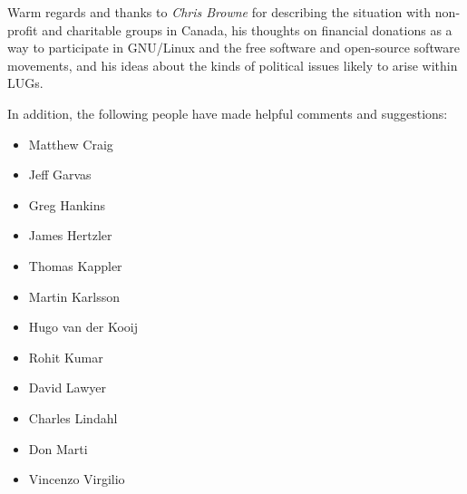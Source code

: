 Warm regards and thanks to 
\emph{Chris Browne} \texttt{\aexurl}
 for describing the situation with
non-profit and charitable groups in Canada, his thoughts on financial
donations as a way to participate in GNU/Linux and the free software and 
open-source software movements, and his ideas about the kinds of
political issues likely to arise within LUGs.

In addition, the following people have made helpful comments and
suggestions:

\begin{itemize}
\item Matthew Craig
\item Jeff Garvas
\item Greg Hankins
\item James Hertzler
\item Thomas Kappler
\item Martin Karlsson
\item Hugo van der Kooij
\item Rohit Kumar
\item David Lawyer
\item Charles Lindahl
\item Don Marti
\item Vincenzo Virgilio
\end{itemize}

